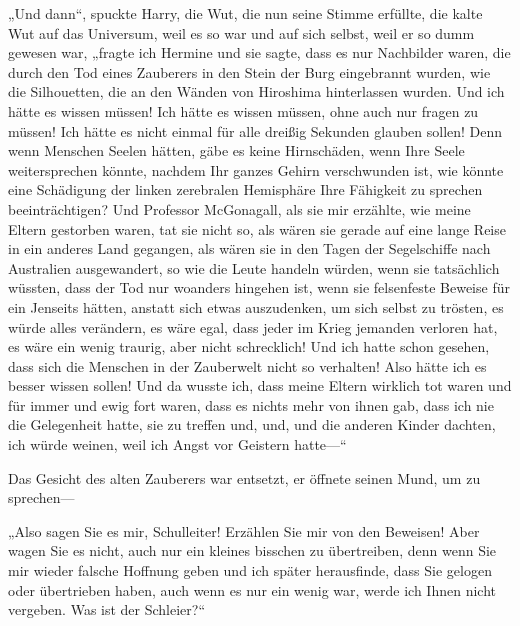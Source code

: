 „Und dann“, spuckte Harry, die Wut, die nun seine Stimme erfüllte, die kalte Wut auf das Universum, weil es so war und auf sich selbst, weil er so dumm gewesen war, „fragte ich Hermine und sie sagte, dass es nur Nachbilder waren, die durch den Tod eines Zauberers in den Stein der Burg eingebrannt wurden, wie die Silhouetten, die an den Wänden von Hiroshima hinterlassen wurden. Und ich hätte es wissen müssen! Ich hätte es wissen müssen, ohne auch nur fragen zu müssen! Ich hätte es nicht einmal für alle dreißig Sekunden glauben sollen! Denn wenn Menschen Seelen hätten, gäbe es keine Hirnschäden, wenn Ihre Seele weitersprechen könnte, nachdem Ihr ganzes Gehirn verschwunden ist, wie könnte eine Schädigung der linken zerebralen Hemisphäre Ihre Fähigkeit zu sprechen beeinträchtigen? Und Professor McGonagall, als sie mir erzählte, wie meine Eltern gestorben waren, tat sie nicht so, als wären sie gerade auf eine lange Reise in ein anderes Land gegangen, als wären sie in den Tagen der Segelschiffe nach Australien ausgewandert, so wie die Leute handeln würden, wenn sie tatsächlich wüssten, dass der Tod nur woanders hingehen ist, wenn sie felsenfeste Beweise für ein Jenseits hätten, anstatt sich etwas auszudenken, um sich selbst zu trösten, es würde alles verändern, es wäre egal, dass jeder im Krieg jemanden verloren hat, es wäre ein wenig traurig, aber nicht schrecklich! Und ich hatte schon gesehen, dass sich die Menschen in der Zauberwelt nicht so verhalten! Also hätte ich es besser wissen sollen! Und da wusste ich, dass meine Eltern wirklich tot waren und für immer und ewig fort waren, dass es nichts mehr von ihnen gab, dass ich nie die Gelegenheit hatte, sie zu treffen und, und, und die anderen Kinder dachten, ich würde weinen, weil ich Angst vor Geistern hatte—“

Das Gesicht des alten Zauberers war entsetzt, er öffnete seinen Mund, um zu sprechen—

„Also sagen Sie es mir, Schulleiter! Erzählen Sie mir von den Beweisen! Aber wagen Sie es nicht, auch nur ein kleines bisschen zu übertreiben, denn wenn Sie mir wieder falsche Hoffnung geben und ich später herausfinde, dass Sie gelogen oder übertrieben haben, auch wenn es nur ein wenig war, werde ich Ihnen nicht vergeben. Was ist der Schleier?“

